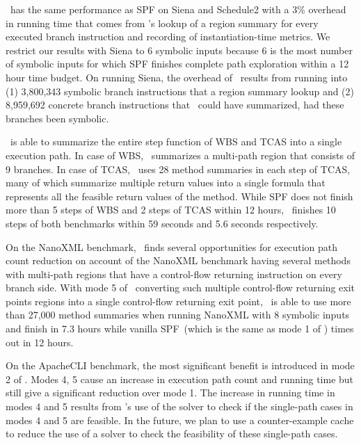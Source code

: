 \tool\ has the same performance as SPF on Siena and Schedule2 with a 3\% overhead in running time that comes from
\tool\rq s lookup of a region summary for every executed branch instruction and recording of instantiation-time metrics.
%
We restrict our results with Siena to 6 symbolic inputs because 6 is the most number of symbolic inputs for which
SPF finishes complete path exploration within a 12 hour time budget.
%
On running Siena, the overhead of \tool\ results from running into (1) 3,800,343 symbolic branch
instructions that a region summary lookup and (2) 8,959,692 concrete branch instructions that
\tool\ could have summarized, had these branches been symbolic.

\tool\ is able to summarize the entire step function of WBS and TCAS into a single execution path.
%
In case of WBS, \tool\ summarizes a multi-path region that consists of 9 branches.
%
In case of TCAS, \tool\ uses 28 method summaries in each step of TCAS, many of which summarize multiple return values
into a single formula that represents all the feasible return values of the method.
%
While SPF does not finish more than 5 steps of WBS and 2 steps of TCAS within 12 hours, \tool\ finishes 10 steps of both
benchmarks within 59 seconds and 5.6 seconds respectively.

On the NanoXML benchmark, \tool\ finds several opportunities for execution path count reduction on account of the
NanoXML benchmark having several methods with multi-path regions that have a control-flow returning instruction on every
branch side.
%
With mode 5 of \tool\ converting such multiple control-flow returning exit points regions into a single control-flow
returning exit point, \tool\ is able to use more than 27,000 method summaries when running NanoXML with 8 symbolic
inputs and finish in 7.3 hours while vanilla SPF~(which is the same as mode 1 of \tool)
times out in 12 hours.

On the ApacheCLI benchmark, the most significant benefit is introduced in mode 2 of \tool.
%
Modes 4, 5 cause an increase in execution path count and running time but still give a significant reduction over
mode 1.
%
The increase in running time in modes 4 and 5 results from \tool\rq s use of the solver to check if the single-path cases
in modes 4 and 5 are feasible.
%
In the future, we plan to use a counter-example cache to reduce the use of a solver to check the feasibility of these
single-path cases.

